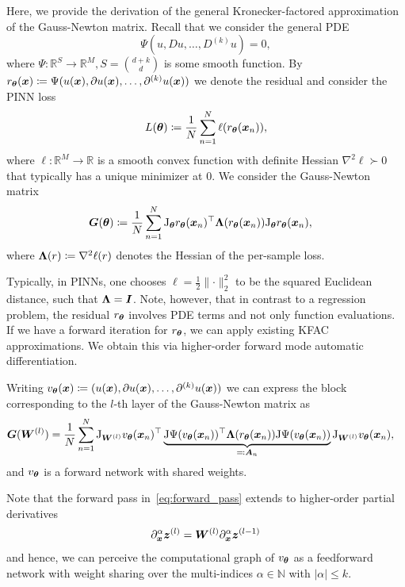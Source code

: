 Here, we provide the derivation of the general Kronecker-factored approximation of the Gauss-Newton matrix.
Recall that we consider the general PDE
\begin{equation}
    \Psi(u, D u, \dots, D^{(k)} u) = 0,
\end{equation}
where $\Psi\colon \mathbb R^{S}\to\mathbb R^M, S=\binom{d+k}{d}$ is some smooth function.
By $r_{\bm{\theta}}({\bm{x}})\coloneqq \Psi(u({\bm{x}}), \partial u({\bm{x}}), \dots, \partial^{(k)} u({\bm{x}}))$ we denote the residual and consider the PINN loss
\begin{equation}
    L({\bm{\theta}})\coloneqq \frac1N\sum_{n=1}^N \ell(r_{{\bm{\theta}}}({\bm{x}}_n)),
\end{equation}
where $\ell\colon\mathbb R^M\to\mathbb R$ is a smooth convex function with definite Hessian $\nabla^2\ell\succ0$ that typically has a unique minimizer at $0$.
We consider the Gauss-Newton matrix
\begin{align}
    {\bm{G}}({\bm{\theta}}) & \coloneqq \frac1N\sum_{n=1}^N \mathrm{J}_{\bm{\theta}} r_{\bm{\theta}}({\bm{x}}_n)^\top {\bm{\Lambda}}(r_{\bm{\theta}}({\bm{x}}_n)) \mathrm{J}_{\bm{\theta}} r_{\bm{\theta}}({\bm{x}}_n),
\end{align}
where ${\bm{\Lambda}}(r)\coloneqq \nabla^2 \ell(r)$ denotes the Hessian of the per-sample loss.

Typically, in PINNs, one chooses $\ell = \frac12\lVert \cdot \rVert_2^2$ to be the squared Euclidean distance, such that ${\bm{\Lambda}} = {\bm{I}}$.
Note, however, that in contrast to a regression problem, the residual $r_{\bm{\theta}}$ involves PDE terms and not only function evaluations.
If we have a forward iteration for $r_{\bm{\theta}}$, we can apply existing KFAC approximations.
We obtain this via higher-order forward mode automatic differentiation.

Writing $v_\vtheta(\vx)\coloneqq (%
u(\vx), \partial u(\vx), \dots, \partial^{(k)} u(\vx))$
we can express the block corresponding to the $l$-th layer of the Gauss-Newton matrix as
\begin{align}
    {\bm{G}}({\bm{W}}^{(l)}) & = \frac1N\sum_{n=1}^N \mathrm{J}_{{\bm{W}}^{(l)}} v_{\bm{\theta}}({\bm{x}}_n)^\top \underbrace{\mathrm{J} \Psi(v_{\bm{\theta}}({\bm{x}}_n))^\top {\bm{\Lambda}}(r_{\bm{\theta}}({\bm{x}}_n)) \mathrm{J} \Psi(v_{\bm{\theta}}({\bm{x}}_n))}_{\eqqcolon {\bm{A}}_n}  \mathrm{J}_{{\bm{W}}^{(l)}} v_{\bm{\theta}}({\bm{x}}_n),
\end{align}
and $v_{\bm{\theta}}$ is a forward network with shared weights.

Note that the forward pass in~\eqref{eq:forward_pass} extends to higher-order partial derivatives
\begin{align}
    \partial_{\bm{x}}^\alpha {\bm{z}}^{(l)} = {\bm{W}}^{(l)}\partial_{\bm{x}}^\alpha {\bm{z}}^{(l-1)}
\end{align}
and hence, we can perceive the computational graph of $v_{\bm{\theta}}$ as a feedforward network with weight sharing over the multi-indices $\alpha\in\mathbb N$ with $\lvert \alpha \rvert \le k$.

